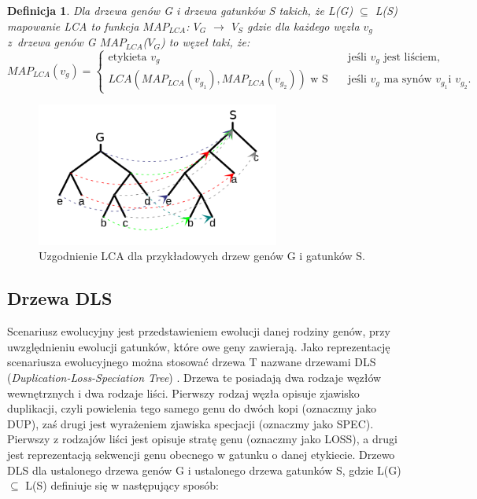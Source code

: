 \documentclass[licencjacka]{pracamgr}
\newtheorem{defi}{Definicja}[section]
\begin{document}
\begin{defi}
Dla drzewa genów G i drzewa gatunków S takich, że L(G) $\subseteq$ L(S) mapowanie LCA to funkcja $MAP_{LCA}$: $V_G$ $\rightarrow$ $V_S$ gdzie dla każdego węzła $v_g$ z~drzewa genów G $MAP_{LCA}$($V_G$) to węzeł taki, że:
\[ MAP_{LCA}(v_g) =
  \begin{cases}
    \text{etykieta }v_g       & \quad \text{jeśli } v_g \text{ jest liściem,}\\
    LCA(MAP_{LCA}(v_{g_1}),MAP_{LCA}(v_{g_2}))\text{ w S}  & \quad \text{jeśli } v_g \text{ ma synów } v_{g_1} \text{i } v_{g_2}.
  \end{cases}
\]
\end{defi}

\begin{figure}[H]
  \centering
  \includegraphics[width=80mm]{./pictures/mapping.png}
  \caption{Uzgodnienie LCA dla przykładowych drzew genów G i gatunków S\cite{gsevol}.}
\end{figure}

\subsection{Drzewa DLS}

Scenariusz ewolucyjny jest przedstawieniem ewolucji danej rodziny genów, przy uwzględnieniu ewolucji gatunków, które owe geny zawierają. Jako reprezentację scenariusza ewolucyjnego można stosować drzewa T nazwane drzewami DLS (\textit{Duplication-Loss-Speciation Tree}) \cite{dls}. Drzewa te posiadają dwa rodzaje węzłów wewnętrznych i dwa rodzaje liści. Pierwszy rodzaj węzła opisuje zjawisko duplikacji, czyli powielenia tego samego genu do dwóch kopi (oznaczmy jako DUP), zaś drugi jest wyrażeniem zjawiska specjacji (oznaczmy jako SPEC). Pierwszy z rodzajów liści jest opisuje stratę genu (oznaczmy jako LOSS), a drugi jest reprezentacją sekwencji genu obecnego w gatunku o danej etykiecie. Drzewo DLS dla ustalonego drzewa genów G i ustalonego drzewa gatunków S, gdzie L(G) $\subseteq$ L(S) definiuje się w następujący sposób:
\end{document}
